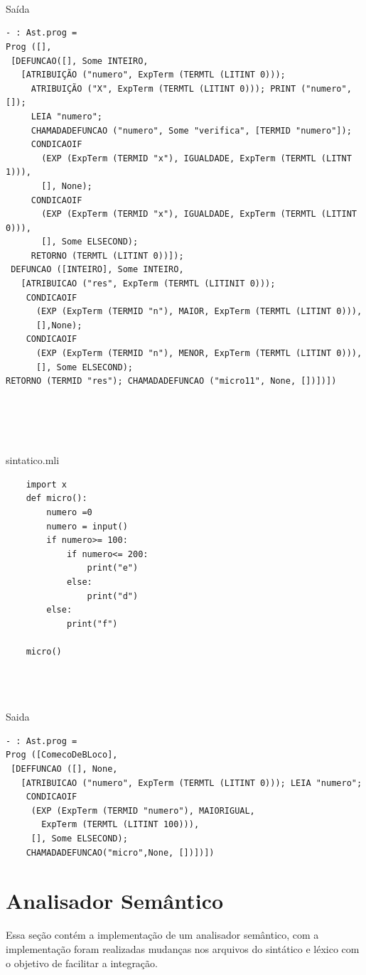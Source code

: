 \documentclass{article}
\begin{document}
\\\\\\Saída
\begin{lstlisting}
- : Ast.prog =
Prog ([],
 [DEFUNCAO([], Some INTEIRO,
   [ATRIBUIÇÃO ("numero", ExpTerm (TERMTL (LITINT 0)));
     ATRIBUIÇÃO ("X", ExpTerm (TERMTL (LITINT 0))); PRINT ("numero", []);
     LEIA "numero";
     CHAMADADEFUNCAO ("numero", Some "verifica", [TERMID "numero"]);
     CONDICAOIF
       (EXP (ExpTerm (TERMID "x"), IGUALDADE, ExpTerm (TERMTL (LITNT 1))),
       [], None);
     CONDICAOIF
       (EXP (ExpTerm (TERMID "x"), IGUALDADE, ExpTerm (TERMTL (LITINT 0))),
       [], Some ELSECOND);
     RETORNO (TERMTL (LITINT 0))]);
 DEFUNCAO ([INTEIRO], Some INTEIRO,
   [ATRIBUICAO ("res", ExpTerm (TERMTL (LITINIT 0)));
    CONDICAOIF
      (EXP (ExpTerm (TERMID "n"), MAIOR, ExpTerm (TERMTL (LITINT 0))),
      [],None);
    CONDICAOIF
      (EXP (ExpTerm (TERMID "n"), MENOR, ExpTerm (TERMTL (LITINT 0))),
      [], Some ELSECOND);
RETORNO (TERMID "res"); CHAMADADEFUNCAO ("micro11", None, [])])])
\end{lstlisting}\\
\
\\\\\\sintatico.mli
\begin{lstlisting}
    import x
    def micro():
        numero =0
        numero = input()
        if numero>= 100:
            if numero<= 200:
                print("e")
            else:
                print("d")
        else:
            print("f")
    
    micro()
\end{lstlisting}
\\\\\\Saida
\begin{lstlisting}
- : Ast.prog =
Prog ([ComecoDeBLoco],
 [DEFFUNCAO ([], None,
   [ATRIBUICAO ("numero", ExpTerm (TERMTL (LITINT 0))); LEIA "numero";
    CONDICAOIF
     (EXP (ExpTerm (TERMID "numero"), MAIORIGUAL,
       ExpTerm (TERMTL (LITINT 100))),
     [], Some ELSECOND);
    CHAMADADEFUNCAO("micro",None, [])])])
\end{lstlisting}






\section{Analisador Semântico}
Essa seção contém a implementação de um analisador semântico, com a implementação foram realizadas mudanças nos arquivos do sintático e léxico com o objetivo de facilitar a integração.\\\
\end{document}

